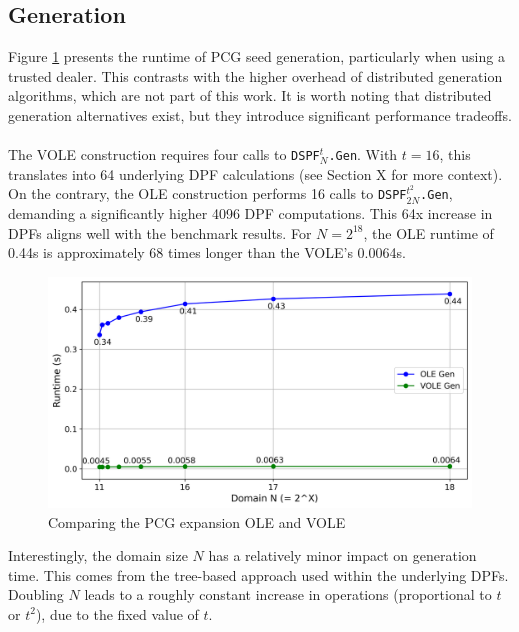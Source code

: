 \subsection{Generation}
\label{subsec:evalGen}
Figure \ref{fig:ComparingPCGGeneration} presents the runtime of PCG seed generation, particularly when using a trusted dealer. This contrasts with the higher overhead of distributed generation algorithms, which are not part of this work. It is worth noting that distributed generation alternatives exist, but they introduce significant performance tradeoffs.
\\\\
The VOLE construction requires four calls to \texttt{DSPF$^{t}_{N}$.Gen}. With $t=16$, this translates into 64 underlying DPF calculations (see Section X for more context). On the contrary, the OLE construction performs 16 calls to \texttt{DSPF$^{t^2}_{2N}$.Gen}, demanding a significantly higher 4096 DPF computations. This 64x increase in DPFs aligns well with the benchmark results. For $N=2^{18}$, the OLE runtime of 0.44s is approximately 68 times longer than the VOLE's 0.0064s. 

\begin{figure}[h!]
    \centering
    \includegraphics[scale=0.49]{images/plots/pcg_gen.png}
    \caption{Comparing the PCG expansion OLE and VOLE}
    \label{fig:ComparingPCGGeneration}
\end{figure}

Interestingly, the domain size $N$ has a relatively minor impact on generation time. This comes from the tree-based approach used within the underlying DPFs. Doubling $N$ leads to a roughly constant increase in operations (proportional to $t$ or $t^2$), due to the fixed value of $t$. 

